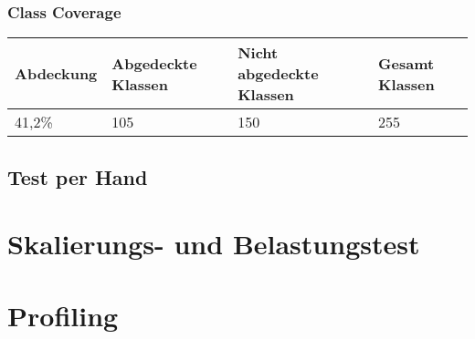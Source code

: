 \documentclass[10pt]{scrreprt}
\begin{document}
\subsection{Class Coverage}
\begin{longtable}{|l|p{}|p{}|p{}|}
\hline
Abdeckung & Abgedeckte Klassen & Nicht abgedeckte Klassen & Gesamt Klassen \\
\hline
\hline
41,2\% & 105 & 150 & 255 \\
\hline
\end{longtable}
\section{Test per Hand}
\chapter{Skalierungs- und Belastungstest}
\chapter{Profiling}
\end{document}
